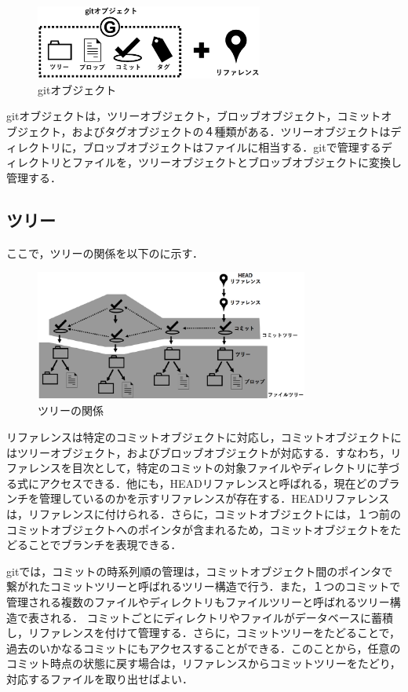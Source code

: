 \documentclass[a4j,9pt,twocolumn]{jsarticle}
\begin{document}
\begin{figure}[h]
\centering
\includegraphics[width=75mm]{img/git_obj2.eps}
\caption{gitオブジェクト}
\label{object2}
\end{figure}

gitオブジェクトは，ツリーオブジェクト，ブロッブオブジェクト，コミットオブジェクト，およびタグオブジェクトの４種類がある．ツリーオブジェクトはディレクトリに，ブロッブオブジェクトはファイルに相当する．gitで管理するディレクトリとファイルを，ツリーオブジェクトとブロッブオブジェクトに変換し管理する．

\subsection{ツリー}
ここで，ツリーの関係を以下のに示す．

\begin{figure}[h]
\centering
\includegraphics[width=90mm]{img/tree.eps}
\caption{ツリーの関係}
\label{tree}
\end{figure}

リファレンスは特定のコミットオブジェクトに対応し，コミットオブジェクトにはツリーオブジェクト，およびブロッブオブジェクトが対応する．すなわち，リファレンスを目次として，特定のコミットの対象ファイルやディレクトリに芋づる式にアクセスできる．他にも，HEADリファレンスと呼ばれる，現在どのブランチを管理しているのかを示すリファレンスが存在する．HEADリファレンスは，リファレンスに付けられる．さらに，コミットオブジェクトには，１つ前のコミットオブジェクトへのポインタが含まれるため，コミットオブジェクトをたどることでブランチを表現できる．

gitでは，コミットの時系列順の管理は，コミットオブジェクト間のポインタで繋がれたコミットツリーと呼ばれるツリー構造で行う．また，１つのコミットで管理される複数のファイルやディレクトリもファイルツリーと呼ばれるツリー構造で表される．
コミットごとにディレクトリやファイルがデータベースに蓄積し，リファレンスを付けて管理する．さらに，コミットツリーをたどることで，過去のいかなるコミットにもアクセスすることができる．このことから，任意のコミット時点の状態に戻す場合は，リファレンスからコミットツリーをたどり，対応するファイルを取り出せばよい．
\end{document}
